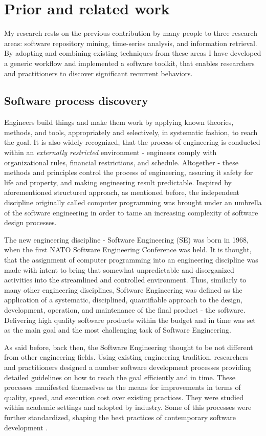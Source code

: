 \chapter{Prior and related work}
My research rests on the previous contribution by many people to three research areas: 
software repository mining, time-series analysis, and information retrieval. By adopting and combining existing
techniques from these areas I have developed a generic workflow and implemented a software toolkit, 
that enables researchers and practitioners to discover significant recurrent behaviors.

\section{Software process discovery}
Engineers build things and make them work by applying known theories, methods, 
and tools, appropriately and selectively, in systematic fashion, to reach the goal. 
It is also widely recognized, that the process of engineering is conducted 
within an \textit{externally restricted} environment - engineers comply with organizational rules, 
financial restrictions, and schedule. Altogether - these methods and principles 
control the process of engineering, assuring it safety for life and property, 
and making engineering result predictable. 
Inspired by aforementioned structured approach, as mentioned before,
the independent discipline originally called computer programming was 
brought under an umbrella of the software engineering in order to tame an increasing 
complexity of software design processes.




The new engineering discipline - Software Engineering (SE) was born in 1968, 
when the first NATO Software Engineering Conference was held. It is thought, 
that the assignment of computer programming into an engineering discipline 
was made with intent to bring that somewhat unpredictable and disorganized 
activities into the streamlined and controlled environment. 
Thus, similarly to many other engineering disciplines, Software Engineering was 
defined as the application of a systematic, disciplined, quantifiable 
approach to the design, development, operation, and maintenance of the 
final product - the software.
Delivering high quality software products within the budget and in 
time was set as the main goal and the most challenging task 
of Software Engineering.

As said before, back then, the Software Engineering thought to be not different 
from other engineering fields. Using existing engineering tradition, researchers 
and practitioners designed a number software development processes providing 
detailed guidelines on how to reach the goal efficiently and in time. 
These processes manifested themselves as the means for improvements in terms of quality, 
speed, and execution cost over existing practices. They were studied within academic 
settings and adopted by industry. Some of this processes were further standardized, 
shaping the best practices of contemporary 
software development \cite{citeulike:9962021}. 

